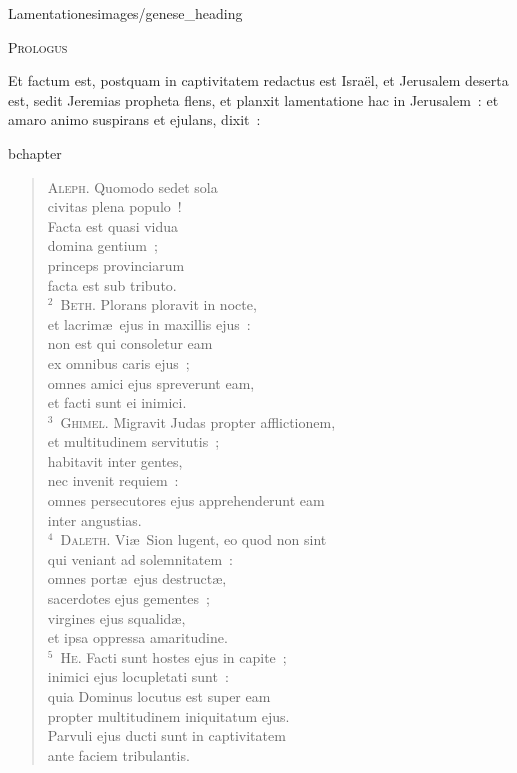 {Lamentationes}{images/genese_heading}

\begin{center}\textsc{Prologus}\end{center}\vspace{-6pt} Et factum est, postquam in captivitatem redactus est Isra\"el, et Jerusalem deserta est, sedit Jeremias propheta flens, et planxit lamentatione hac in Jerusalem~: et amaro animo suspirans et ejulans, dixit~: 

bchapter\begin{flushleft}\begin{verse}\vspace{-19pt}\textsc{Aleph.} Quomodo sedet sola\\ civitas plena populo~!\\ Facta est quasi vidua\\ domina gentium~;\\ princeps provinciarum\\ facta est sub tributo.\\
${}^{2}$~\textsc{Beth.} Plorans ploravit in nocte,\\ et lacrim\ae\ ejus in maxillis ejus~:\\ non est qui consoletur eam\\ ex omnibus caris ejus~;\\ omnes amici ejus spreverunt eam,\\ et facti sunt ei inimici.\\
${}^{3}$~\textsc{Ghimel.} Migravit Judas propter afflictionem,\\ et multitudinem servitutis~;\\ habitavit inter gentes,\\ nec invenit requiem~:\\ omnes persecutores ejus apprehenderunt eam\\ inter angustias.\\
${}^{4}$~\textsc{Daleth.} Vi\ae\ Sion lugent, eo quod non sint\\ qui veniant ad solemnitatem~:\\ omnes port\ae\ ejus destruct\ae ,\\ sacerdotes ejus gementes~;\\ virgines ejus squalid\ae ,\\ et ipsa oppressa amaritudine.\\
${}^{5}$~\textsc{He.} Facti sunt hostes ejus in capite~;\\ inimici ejus locupletati sunt~:\\ quia Dominus locutus est super eam\\ propter multitudinem iniquitatum ejus.\\ Parvuli ejus ducti sunt in captivitatem\\ ante faciem tribulantis.\\

\end{verse}
\end{flushleft}
